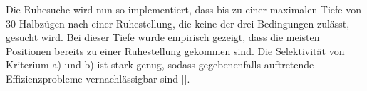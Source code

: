 Die Ruhesuche wird nun so implementiert, dass bis zu einer maximalen Tiefe von 30 Halbzügen nach einer Ruhestellung, die keine der drei Bedingungen zulässt, gesucht wird.
Bei dieser Tiefe wurde empirisch gezeigt, dass die meisten Positionen bereits zu einer Ruhestellung gekommen sind.
Die Selektivität von Kriterium a) und b) ist stark genug, sodass gegebenenfalls auftretende Effizienzprobleme vernachlässigbar sind [\cite{Stuckardt}].
